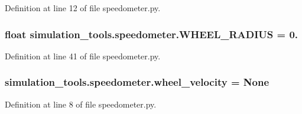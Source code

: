 Definition at line 12 of file speedometer.\+py.

\subsubsection[{\texorpdfstring{W\+H\+E\+E\+L\+\_\+\+R\+A\+D\+I\+US}{WHEEL_RADIUS}}]{\setlength{\rightskip}{0pt plus 5cm}float simulation\+\_\+tools.\+speedometer.\+W\+H\+E\+E\+L\+\_\+\+R\+A\+D\+I\+US = 0.}\hypertarget{namespacesimulation__tools_1_1speedometer_abc578ddedab907737091cb86856732e7}{}\label{namespacesimulation__tools_1_1speedometer_abc578ddedab907737091cb86856732e7}


Definition at line 41 of file speedometer.\+py.

\subsubsection[{\texorpdfstring{wheel\+\_\+velocity}{wheel_velocity}}]{\setlength{\rightskip}{0pt plus 5cm}simulation\+\_\+tools.\+speedometer.\+wheel\+\_\+velocity = None}\hypertarget{namespacesimulation__tools_1_1speedometer_a6d93deddfe3b707f9be21ed85278d8b5}{}\label{namespacesimulation__tools_1_1speedometer_a6d93deddfe3b707f9be21ed85278d8b5}


Definition at line 8 of file speedometer.\+py.

